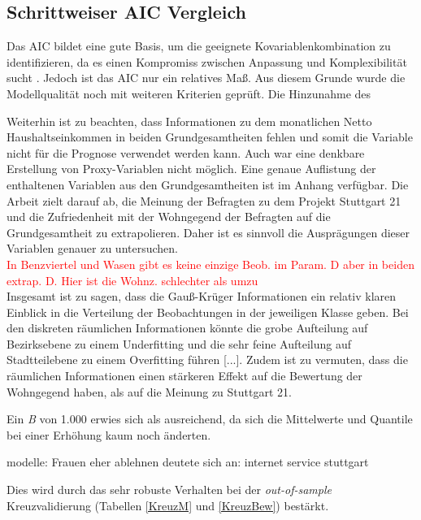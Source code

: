 \documentclass{Vorlage}
\begin{document}
\subsection{Schrittweiser AIC Vergleich}
Das AIC bildet eine gute Basis, um die geeignete Kovariablenkombination zu identifizieren, da es einen Kompromiss zwischen Anpassung und Komplexibilität sucht \cite{Akaike1981}. Jedoch ist das AIC nur ein relatives Maß. Aus diesem Grunde wurde die Modellqualität noch mit weiteren Kriterien geprüft. Die Hinzunahme des 

Weiterhin ist zu beachten, dass Informationen zu dem monatlichen Netto Haushaltseinkommen in beiden Grundgesamtheiten fehlen und somit die Variable nicht für die Prognose verwendet werden kann. Auch war eine denkbare Erstellung von Proxy-Variablen nicht möglich. Eine genaue Auflistung der enthaltenen Variablen aus den Grundgesamtheiten ist im Anhang verfügbar. Die Arbeit zielt darauf ab, die Meinung der Befragten zu dem Projekt Stuttgart 21 und die Zufriedenheit mit der Wohngegend der Befragten auf die Grundgesamtheit zu extrapolieren. Daher ist es sinnvoll die Ausprägungen dieser Variablen genauer zu untersuchen.\\

\textcolor{red}{In Benzviertel und Wasen gibt es keine einzige Beob. im Param. D aber in beiden extrap. D. Hier ist die Wohnz. schlechter als umzu}\\
Insgesamt ist zu sagen, dass die Gauß-Krüger Informationen ein relativ klaren Einblick in die Verteilung der Beobachtungen in der jeweiligen Klasse geben. Bei den diskreten räumlichen Informationen könnte die grobe Aufteilung auf Bezirksebene zu einem Underfitting und die sehr feine Aufteilung auf Stadtteilebene zu einem Overfitting führen [...]. Zudem ist zu vermuten, dass die räumlichen Informationen einen stärkeren Effekt auf die Bewertung der Wohngegend haben, als auf die Meinung zu Stuttgart 21.

Ein \textit{B} von 1.000 erwies sich als ausreichend, da sich die Mittelwerte und Quantile bei einer Erhöhung kaum noch änderten.

modelle: Frauen eher ablehnen deutete sich an: internet service stuttgart

Dies wird durch das sehr robuste Verhalten bei der \textit{out-of-sample} Kreuzvalidierung (Tabellen \ref{KreuzM} und \ref{KreuzBew}) bestärkt.
\newpage
\end{document}
